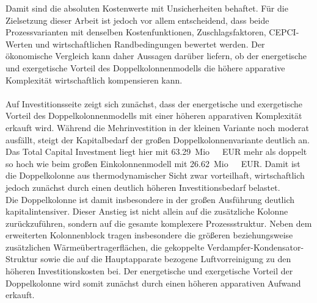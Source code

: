 Damit sind die absoluten Kostenwerte mit Unsicherheiten behaftet. Für die Zielsetzung dieser Arbeit ist jedoch vor allem entscheidend, dass beide Prozessvarianten mit denselben Kostenfunktionen, Zuschlagsfaktoren, CEPCI-Werten und wirtschaftlichen Randbedingungen bewertet werden. Der ökonomische Vergleich kann daher Aussagen darüber liefern, ob der energetische und exergetische Vorteil des Doppelkolonnenmodells die höhere apparative Komplexität wirtschaftlich kompensieren kann.\\
\\
Auf Investitionsseite zeigt sich zunächst, dass der energetische und exergetische Vorteil des Doppelkolonnenmodells mit einer höheren apparativen Komplexität erkauft wird. Während die Mehrinvestition in der kleinen Variante noch moderat ausfällt, steigt der Kapitalbedarf der großen Doppelkolonnenvariante deutlich an. Das Total Capital Investment liegt hier mit \SI{63.29}{Mio.\ EUR} mehr als doppelt so hoch wie beim großen Einkolonnenmodell mit \SI{26.62}{Mio.\ EUR}. Damit ist die Doppelkolonne aus thermodynamischer Sicht zwar vorteilhaft, wirtschaftlich jedoch zunächst durch einen deutlich höheren Investitionsbedarf belastet.\\
Die Doppelkolonne ist damit insbesondere in der großen Ausführung deutlich kapitalintensiver. Dieser Anstieg ist nicht allein auf die zusätzliche Kolonne zurückzuführen, sondern auf die gesamte komplexere Prozessstruktur. Neben dem erweiterten Kolonnenblock tragen insbesondere die größeren beziehungsweise zusätzlichen Wärmeübertragerflächen, die gekoppelte Verdampfer-Kondensator-Struktur sowie die auf die Hauptapparate bezogene Luftvorreinigung zu den höheren Investitionskosten bei. Der energetische und exergetische Vorteil der Doppelkolonne wird somit zunächst durch einen höheren apparativen Aufwand erkauft.

